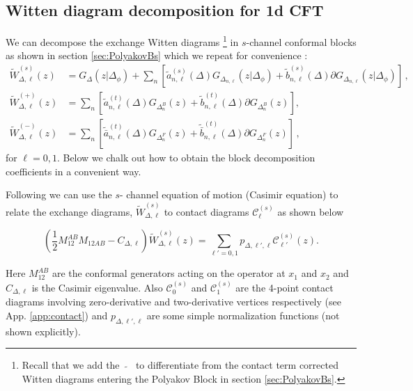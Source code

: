 \documentclass[12pt]{article}
\numberwithin{equation}{section}
\newcommand{\Df}{{\Delta_\phi}}
\def\D{\Delta}
\begin{document}
\subsection{Witten diagram decomposition for 1d CFT}
We can decompose the exchange Witten diagrams \footnote{Recall that we add the \ $\widetilde{}$ \  to differentiate from the contact term corrected Witten diagrams entering the Polyakov Block in section  \ref{sec:PolyakovBs}.} in $s$-channel conformal blocks as shown in section \ref{sec:PolyakovBs} which we repeat for convenience \big[denoting $\widetilde{W}^{(\pm)}_{\D,\ell}=\frac 12 (\widetilde{W}^{(t)}_{\D,\ell}\pm(-1)^{\ell}\widetilde{W}^{(u)}_{\D,\ell})$ \big]:
\begin{align}\label{Wittendecom}
\widetilde{W}^{(s)}_{\Delta,\ell}(z)&=G_{\Delta}(z|\Df)+\sum_n \left[\widetilde{a}_{n,\ell}^{(s)}(\D) G_{\D_{n,\ell}}(z|\Df)+ \widetilde{b}_{n,\ell}^{(s)}(\D) \partial G_{\D_{n,\ell}}(z|\Df)\right]\,,\nonumber\\ 
\widetilde{W}^{(+)}_{\Delta,\ell}(z)&=\sum_{n}\left[ \widetilde{a}_{n,\ell}^{(t)}(\Delta) G_{\D_n^B}(z)+ \widetilde{b}_{n,\ell}^{(t)}(\Delta) \partial G_{\D_n^B}(z)\right], \\ 
\widetilde{W}^{(-)}_{\Delta,\ell}(z)&=\sum_{n}\left[ \widetilde{\bar a}_{n,\ell}^{(t)}(\Delta) G_{\D_n^F}(z)+ \widetilde{\bar b}_{n,\ell}^{(t)}(\Delta) \partial G_{\D_n^F}(z)\right]\nonumber\,,
\end{align}
for $\ell=0,1$.	 Below we chalk out how to obtain the block decomposition coefficients in a convenient way.

Following \cite{Zhou:2018sfz}  we can use the $s$- channel equation of motion (Casimir equation) to relate the exchange diagrams, $\widetilde{W}^{(s)}_{\Delta,\ell}$ to contact diagrams $\mathcal{C}^{(s)}_{\ell}$ as shown below

\begin{equation}\label{exchangecontact}
\left(\frac{1}{2}M^{AB}_{12}M_{12AB}-C_{\Delta,\ell}\right)\widetilde{W}^{(s)}_{\Delta,\ell}(z)= \sum_{\ell'=0,1}p_{\D,\ell',\ell} \mathcal{C}^{(s)}_{\ell'}(z).
\end{equation}

Here $M^{AB}_{12}$ are the conformal generators acting on the operator at $x_1$ and $x_2$ and $C_{\Delta,\ell}$ is the Casimir eigenvalue. Also $\mathcal{C}^{(s)}_{0}$ and $\mathcal{C}^{(s)}_{1}$ are the 4-point contact diagrams involving zero-derivative and two-derivative vertices respectively (see App. \ref{app:contact}) and $p_{\D,\ell',\ell}$ are some simple normalization functions (not shown explicitly). 
\end{document}
